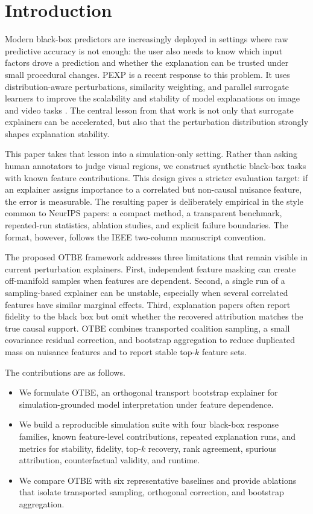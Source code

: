 \documentclass[10pt,conference,letterpaper]{IEEEtran}
\newcommand{\method}{OTBE}
\begin{document}
\section{Introduction}

Modern black-box predictors are increasingly deployed in settings where raw predictive accuracy is not enough: the user also needs to know which input factors drove a prediction and whether the explanation can be trusted under small procedural changes.  PEXP is a recent response to this problem.  It uses distribution-aware perturbations, similarity weighting, and parallel surrogate learners to improve the scalability and stability of model explanations on image and video tasks \cite{jiang2026pexp}.  The central lesson from that work is not only that surrogate explainers can be accelerated, but also that the perturbation distribution strongly shapes explanation stability.

This paper takes that lesson into a simulation-only setting.  Rather than asking human annotators to judge visual regions, we construct synthetic black-box tasks with known feature contributions.  This design gives a stricter evaluation target: if an explainer assigns importance to a correlated but non-causal nuisance feature, the error is measurable.  The resulting paper is deliberately empirical in the style common to NeurIPS papers: a compact method, a transparent benchmark, repeated-run statistics, ablation studies, and explicit failure boundaries.  The format, however, follows the IEEE two-column manuscript convention.

The proposed \method{} framework addresses three limitations that remain visible in current perturbation explainers.  First, independent feature masking can create off-manifold samples when features are dependent.  Second, a single run of a sampling-based explainer can be unstable, especially when several correlated features have similar marginal effects.  Third, explanation papers often report fidelity to the black box but omit whether the recovered attribution matches the true causal support.  \method{} combines transported coalition sampling, a small covariance residual correction, and bootstrap aggregation to reduce duplicated mass on nuisance features and to report stable top-$k$ feature sets.

The contributions are as follows.
\begin{itemize}
    \item We formulate \method{}, an orthogonal transport bootstrap explainer for simulation-grounded model interpretation under feature dependence.
    \item We build a reproducible simulation suite with four black-box response families, known feature-level contributions, repeated explanation runs, and metrics for stability, fidelity, top-$k$ recovery, rank agreement, spurious attribution, counterfactual validity, and runtime.
    \item We compare \method{} with six representative baselines and provide ablations that isolate transported sampling, orthogonal correction, and bootstrap aggregation.
\end{itemize}
\end{document}

